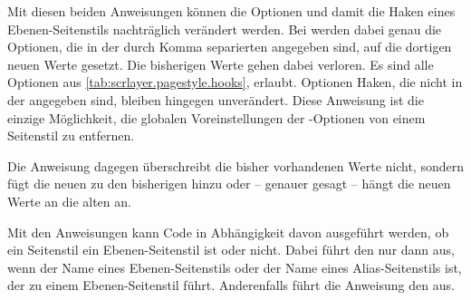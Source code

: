 \begin{Declaration}
\end{Declaration}
%
%
Mit diesen beiden Anweisungen können die Optionen und damit die
Haken eines Ebenen-Seitenstils nachträglich verändert werden. Bei
werden dabei genau die Optionen, die in der durch Komma separierten
 angegeben sind, auf die dortigen neuen Werte
gesetzt. Die bisherigen Werte gehen dabei verloren. Es sind alle Optionen aus
\autoref{tab:scrlayer.pagestyle.hooks},
 erlaubt. Optionen
 Haken, die nicht in der 
angegeben sind, bleiben hingegen unverändert. Diese Anweisung ist
die einzige Möglichkeit, die globalen Voreinstellungen der
\KOMAScript-Optionen von einem Seitenstil zu entfernen.

Die Anweisung  dagegen überschreibt die bisher vorhandenen Werte nicht, sondern
fügt die neuen zu den bisherigen hinzu oder -- genauer gesagt -- hängt die
neuen Werte an die alten an.%
\EndIndexGroup


\begin{Declaration}
\end{Declaration}
%
%
Mit den Anweisungen kann Code in Abhängigkeit davon ausgeführt werden, ob
ein Seitenstil ein Ebenen-Seitenstil ist oder nicht. Dabei führt
 den  nur dann aus, wenn
 der Name eines Ebenen-Seitenstils oder der Name eines
Alias-Seitenstils ist, der zu einem Ebenen-Seitenstil führt. Anderenfalls
führt die Anweisung den  aus.

